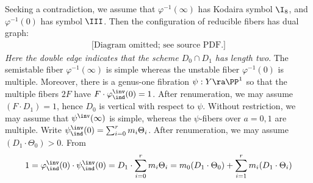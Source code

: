 \proof
Seeking a contradiction, we assume that $\varphi^{-1}(\infty)$ has Kodaira symbol $\I_8$, and $\varphi^{-1}(0)$ has symbol $\III$.
Then   the configuration of reducible fibers has dual graph:
%
%
\begin{equation*}
\begin{gathered}
\text{[Diagram omitted; see source PDF.]}
\end{gathered}
\end{equation*}
\emph{Here the double edge indicates that the   scheme $D_0\cap D_1$ has length two}.
The semistable fiber $\varphi^{-1}(\infty)$  is simple whereas the unstable fiber $\varphi^{-1}(0)$  is multiple.
Moreover,  there is a genus-one fibration $\psi:Y\ra\PP^1$ so that the multiple fibers $2F$ have
$F\cdot \varphi^\inv_\ind(0)=1$.
After renumeration, we may assume   $(F\cdot D_1)=1$, hence $D_0$ is vertical with respect to $\psi$.
Without restriction, we may assume that $\psi^\inv(\infty)$ is simple, whereas the $\psi$-fibers over $a=0,1$ are multiple.
Write $\psi^\inv_\ind(0)=\sum_{i=0}^r m_i \Theta_i$. After renumeration, we may assume $(D_1\cdot \Theta_0)>0$.
From
$$
1=\varphi^\inv_\ind(0)\cdot\psi^\inv_\ind(0) = D_1\cdot \sum_{i=0}^rm_i\Theta_i = m_0(D_1\cdot\Theta_0) + \sum_{i=1}^r m_i(D_1\cdot\Theta_i)
$$
